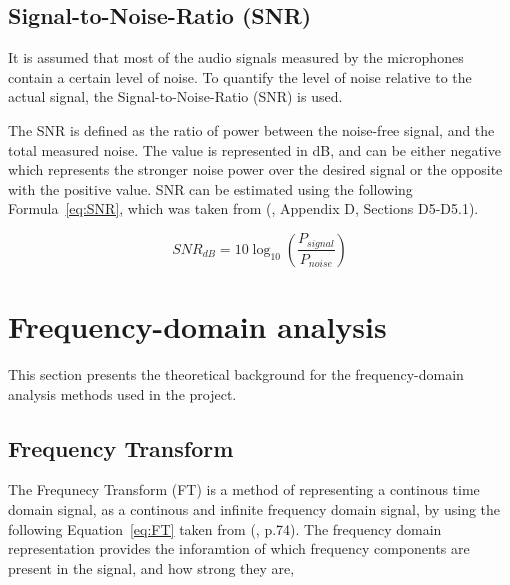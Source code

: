     

    

    \subsection{Signal-to-Noise-Ratio (SNR)}
    
    \label{Sec:SNR}

    It is assumed that most of the audio signals measured by the microphones contain a certain level of noise. To quantify the level of noise relative to the actual signal,
    the Signal-to-Noise-Ratio (SNR) is used.
    
    The SNR is defined as the ratio of power between the noise-free signal, and the total measured noise. The value is represented in dB, and can be either negative which represents the stronger noise power over the desired signal or the opposite with the positive value.
    SNR can be estimated using the following Formula~\ref{eq:SNR}, which was taken from (\cite{understanding_dsp}, Appendix D, Sections D5-D5.1).
    
    \begin{equation}
        \label{eq:SNR}
        SNR_{dB} = 10 \log_{10}(\dfrac{P_{signal}}{P_{noise}})
    \end{equation}

\section{Frequency-domain analysis}
This section presents the theoretical background for the frequency-domain analysis methods used in the project.

\subsection{Frequency Transform}
    The Frequnecy Transform (FT) is a method of representing a continous time domain signal, as a continous and infinite frequency domain signal, by using the following Equation~\ref{eq:FT} taken from (\cite{understanding_dsp}, p.74). The frequency domain representation provides the inforamtion of which frequency components are present in the signal, and how strong they are,

